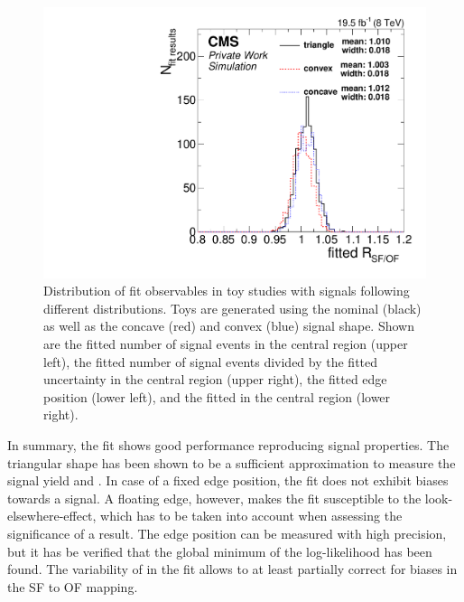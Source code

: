 \begin{figure}[b]
\begin{minipage}[t]{0.49\textwidth}
  \end{minipage}
  \begin{minipage}[t]{0.49\textwidth}
    \includegraphics[width=\textwidth]{plots/results/fit/toyResults/rSFOF_shapeBias.pdf}
  \end{minipage}
  \caption{Distribution of fit observables in toy studies with signals following different distributions. Toys are generated using the nominal (black) as well as the concave (red) and convex (blue) signal shape. Shown are the fitted number of signal events in the central region (upper left), the fitted number of signal events divided by the fitted uncertainty in the central region (upper right), the fitted edge position (lower left), and the fitted \Rsfof in the central region (lower right).}
  \label{fig:toys:signalInjectedShapeBias}
\end{figure}

In summary, the fit shows good performance reproducing signal properties. The triangular shape has been shown to be a sufficient approximation to measure the signal yield and \mlledge. In case of a fixed edge position, the fit does not exhibit biases towards a signal. A floating edge, however, makes the fit susceptible to the look-elsewhere-effect, which has to be taken into account when assessing the significance of a result. The edge position can be measured with high precision, but it has be verified that the global minimum of the log-likelihood has been found. The variability of \Rsfof in the fit allows to at least partially correct for biases in the SF to OF mapping.
\clearpage
